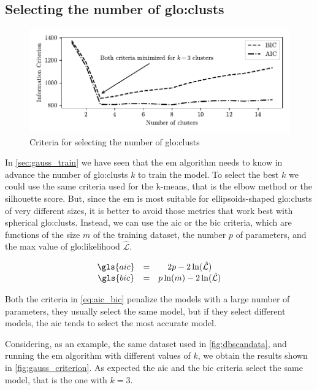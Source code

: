 \subsection{Selecting the number of \gls{glo:clust}s}
\begin{figure}[htbp]
    \centering
    \includegraphics{images/Gaussian/Figure_1.pdf}
    \caption{Criteria for selecting the number of \gls{glo:clust}s}
    \label{fig:gauss_criterion}
\end{figure}
In \autoref{sec:gauss_train} we have seen that the \gls{em} algorithm needs to know in advance the number of \gls{glo:clust}s $k$ to train the model. To select the best $k$ we could use the same criteria used for the k-means, that is the elbow method or the silhouette score. But, since the \gls{em} is most suitable for ellipsoids-shaped \gls{glo:clust}s of very different sizes, it is better to avoid those metrics that work best with spherical \gls{glo:clust}s. Instead, we can use the \gls{aic} or the \gls{bic} criteria, which are functions of the size $m$ of the training dataset, the number $p$ of parameters, and the max value of \gls{glo:likelihood} $\hat{\mathcal{L}}$.

\begin{equation}
    \begin{matrix}
        \gls{aic} &=& 2p - 2 \ln(\hat{\mathcal{L}}) \\
        \gls{bic} &=& p \ln(m) - 2 \ln(\hat{\mathcal{L}})
    \end{matrix}
    \label{eq:aic_bic}
\end{equation}

Both the criteria in \autoref{eq:aic_bic} penalize the models with a large number of parameters, they usually select the same model, but if they select different models, the \gls{aic} tends to select the most accurate model.

Considering, as an example, the same dataset used in \autoref{fig:dbscandata}, and running the \gls{em} algorithm with different values of $k$, we obtain the results shown in \autoref{fig:gauss_criterion}. As expected the \gls{aic} and the \gls{bic} criteria select the same model, that is the one with $k=3$.

